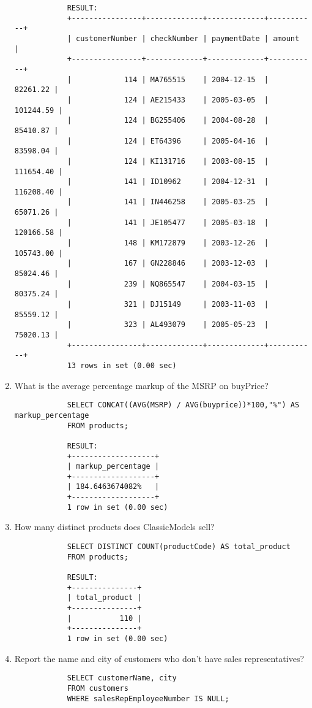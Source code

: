 \documentclass{article}
\begin{document}
\begin{enumerate}
\begin{verbatim}
			RESULT:
			+----------------+-------------+-------------+-----------+
			| customerNumber | checkNumber | paymentDate | amount    |
			+----------------+-------------+-------------+-----------+
			|            114 | MA765515    | 2004-12-15  |  82261.22 |
			|            124 | AE215433    | 2005-03-05  | 101244.59 |
			|            124 | BG255406    | 2004-08-28  |  85410.87 |
			|            124 | ET64396     | 2005-04-16  |  83598.04 |
			|            124 | KI131716    | 2003-08-15  | 111654.40 |
			|            141 | ID10962     | 2004-12-31  | 116208.40 |
			|            141 | IN446258    | 2005-03-25  |  65071.26 |
			|            141 | JE105477    | 2005-03-18  | 120166.58 |
			|            148 | KM172879    | 2003-12-26  | 105743.00 |
			|            167 | GN228846    | 2003-12-03  |  85024.46 |
			|            239 | NQ865547    | 2004-03-15  |  80375.24 |
			|            321 | DJ15149     | 2003-11-03  |  85559.12 |
			|            323 | AL493079    | 2005-05-23  |  75020.13 |
			+----------------+-------------+-------------+-----------+
			13 rows in set (0.00 sec)
			\end{verbatim}
		\item What is the average percentage markup of the MSRP on buyPrice?
			\begin{verbatim}
			SELECT CONCAT((AVG(MSRP) / AVG(buyprice))*100,"%") AS markup_percentage
			FROM products;
			
			RESULT:
			+-------------------+
			| markup_percentage |
			+-------------------+
			| 184.6463674082%   |
			+-------------------+
			1 row in set (0.00 sec)
			\end{verbatim}
		\item How many distinct products does ClassicModels sell?
			\begin{verbatim}
			SELECT DISTINCT COUNT(productCode) AS total_product
			FROM products;
			
			RESULT:
			+---------------+
			| total_product |
			+---------------+
			|           110 |
			+---------------+
			1 row in set (0.00 sec)
			\end{verbatim}
		\item Report the name and city of customers who don't have sales representatives?
			\begin{verbatim}
			SELECT customerName, city
			FROM customers
			WHERE salesRepEmployeeNumber IS NULL;
			

\end{verbatim}
\end{enumerate}
\end{document}
